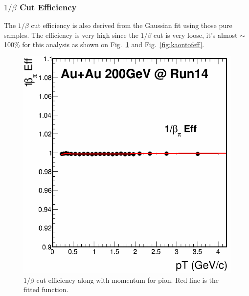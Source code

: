\documentclass[a4paper]{article}
\begin{document}
\subsubsection{$1/\beta$ Cut Efficiency}
The $1/\beta$ cut efficiency is also derived from the Gaussian fit using those pure samples. The efficiency is very high since the $1/\beta$ cut is very loose, it's almost $\sim$100\% for this analysis as shown on Fig.~\ref{fig:piontofeff} and Fig.~\ref{fig:kaontofeff}.

\begin{figure}[htbp]
\begin{minipage}[htbp]{0.5\linewidth}
\centering
\includegraphics[width=1.0\textwidth]{fig/nSigPionTof_eff.png}
\caption{$1/\beta$ cut efficiency along with momentum for pion. Red line is the fitted function. \label{fig:piontofeff}}
\end{minipage}
\hfill
\begin{minipage}[htbp]{0.5\linewidth}
\centering

\end{minipage}
\end{figure}
\end{document}
